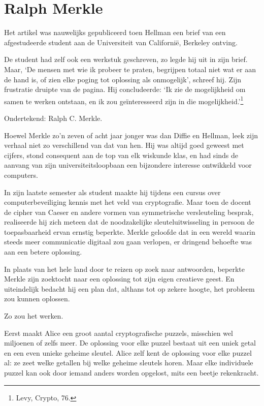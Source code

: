 \documentclass[
  a5paper,
  smalldemyvopaper,11pt,twoside,onecolumn,openright,extrafontsizes,
hidelinks]{memoir}
\begin{document}
\section{Ralph Merkle}\label{ralph-merkle}

Het artikel was nauwelijks gepubliceerd toen Hellman een brief van een
afgestudeerde student aan de Universiteit van Californië, Berkeley
ontving.

De student had zelf ook een werkstuk geschreven, zo legde hij uit in
zijn brief. Maar, `De mensen met wie ik probeer te praten, begrijpen
totaal niet wat er aan de hand is, of zien elke poging tot oplossing als
onmogelijk', schreef hij. Zijn frustratie druipte van de pagina. Hij
concludeerde: `Ik zie de mogelijkheid om samen te werken ontstaan, en ik
zou geïnteresseerd zijn in die mogelijkheid.'\footnote{\hspace{0pt}Levy,
  Crypto, 76.}

Ondertekend: Ralph C. Merkle.

Hoewel Merkle zo'n zeven of acht jaar jonger was dan Diffie en Hellman,
leek zijn verhaal niet zo verschillend van dat van hen. Hij was altijd
goed geweest met cijfers, stond consequent aan de top van elk wiskunde
klas, en had sinds de aanvang van zijn universiteitsloopbaan een
bijzondere interesse ontwikkeld voor computers.

In zijn laatste semester als student maakte hij tijdens een cursus over
computerbeveiliging kennis met het veld van cryptografie. Maar toen de
docent de cipher van Caeser en andere vormen van symmetrische
versleuteling besprak, realiseerde hij zich meteen dat de noodzakelijke
sleuteluitwisseling in persoon de toepasbaarheid ervan ernstig beperkte.
Merkle geloofde dat in een wereld waarin steeds meer communicatie
digitaal zou gaan verlopen, er dringend behoefte was aan een betere
oplossing.

In plaats van het hele land door te reizen op zoek naar antwoorden,
beperkte Merkle zijn zoektocht naar een oplossing tot zijn eigen
creatieve geest. En uiteindelijk bedacht hij een plan dat, althans tot
op zekere hoogte, het probleem zou kunnen oplossen.

Zo zou het werken.

Eerst maakt Alice een groot aantal cryptografische puzzels, misschien
wel miljoenen of zelfs meer. De oplossing voor elke puzzel bestaat uit
een uniek getal en een even unieke geheime sleutel. Alice zelf kent de
oplossing voor elke puzzel al: ze zeet welke getallen bij welke geheime
sleutels horen. Maar elke individuele puzzel kan ook door iemand anders
worden opgelost, mits een beetje rekenkracht.
\end{document}
